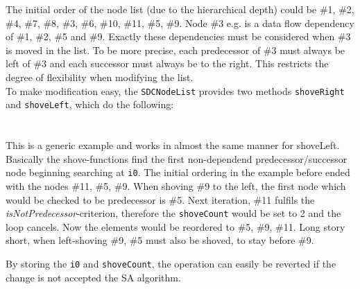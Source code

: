 \documentclass[colorback,accentcolor=tud1c,11pt]{tudreport}
\newcommand\code[1]{\texttt{#1}}
\begin{document}
The initial order of the node list (due to the hierarchical depth) could be \#1, \#2, \#4, \#7, \#8, \#3, \#6, \#10, \#11, \#5, \#9. Node \#3 e.g. is a data flow dependency of \#1, \#2, \#5 and \#9. Exactly these dependencies must be considered when \#3 is moved in the list. To be more precise, each predecessor of \#3 must always be left of \#3 and each successor must always be to the right. This restricts the degree of flexibility when modifying the list.\\
To make modification easy, the \code{SDCNodeList} provides two methods \code{shoveRight} and \code{shoveLeft}, which do the following:\\

\\ \\

This is a generic example and works in almost the same manner for shoveLeft. Basically the shove-functions find the first non-dependend predecessor/successor node beginning searching at \code{i0}. The initial ordering in the example before ended with the nodes \#11, \#5, \#9. When shoving \#9 to the left, the first node which would be checked to be predecessor is \#5. Next iteration, \#11 fulfils the \textit{isNotPredecessor}-criterion, therefore the \code{shoveCount} would be set to 2 and the loop cancels. Now the elements would be reordered to \#5, \#9, \#11. Long story short, when left-shoving \#9, \#5 must also be shoved, to stay before \#9.\par
By storing the \code{i0} and \code{shoveCount}, the operation can easily be reverted if the change is not accepted the SA algorithm.\par
\end{document}
